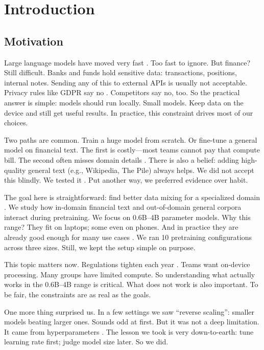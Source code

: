 \chapter{Introduction}

\section{Motivation}

Large language models have moved very fast \parencite{vaswani2017attention,radford2019language,brown2020language,touvron2023llama}. Too fast to ignore. But finance? Still difficult. Banks and funds hold sensitive data: transactions, positions, internal notes. Sending any of this to external APIs is usually not acceptable. Privacy rules like GDPR say no \parencite{eu2016gdpr}. Competitors say no, too. So the practical answer is simple: models should run locally. Small models. Keep data on the device and still get useful results. In practice, this constraint drives most of our choices.

Two paths are common. Train a huge model from scratch. Or fine-tune a general model on financial text. The first is costly—most teams cannot pay that compute bill. The second often misses domain details \parencite{gururangan2020don}. There is also a belief: adding high-quality general text (e.g., Wikipedia, The Pile) always helps. We did not accept this blindly. We tested it \parencite{gao2020pile,raffel2020exploring,longpre2023pretrainer}. Put another way, we preferred evidence over habit.

The goal here is straightforward: find better data mixing for a specialized domain \parencite{wu2023bloomberggpt}. We study how in-domain financial text and out-of-domain general corpora interact during pretraining. We focus on 0.6B–4B parameter models. Why this range? They fit on laptops; some even on phones. And in practice they are already good enough for many use cases \parencite{yang2024qwen2,xia2023sheared,team2024gemma,javaheripi2023phi}. We ran 10 pretraining configurations across three sizes. Still, we kept the setup simple on purpose.

This topic matters now. Regulations tighten each year \parencite{eu2016gdpr}. Teams want on-device processing. Many groups have limited compute. So understanding what actually works in the 0.6B--4B range is critical. What does not work is also important. To be fair, the constraints are as real as the goals.

One more thing surprised us. In a few settings we saw ``reverse scaling'': smaller models beating larger ones. Sounds odd at first. But it was not a deep limitation. It came from hyperparameters \parencite{kaplan2020scaling,hoffmann2022training,mccandlish2018empirical}. The lesson we took is very down-to-earth: tune learning rate first; judge model size later. So we did.

